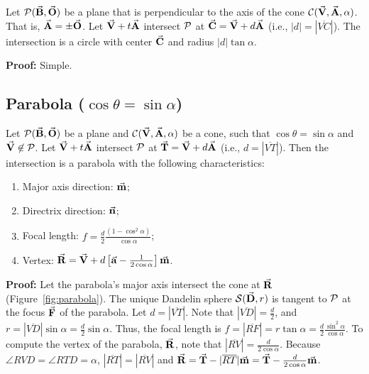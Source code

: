 \begin{lemma}
\label{lemma:parallel-1}
     Let ${\cal P}(\vec{\bf B},\vec{\bf O})$ be a plane that is perpendicular to
the axis of the cone ${\cal C}(\vec{\bf V},\vec{\bf A},\alpha)$.
That is, $\vec{\bf A} = \pm\vec{\bf O}$.  Let $\vec{\bf V}+t\vec{\bf A}$ intersect
${\cal P}$ at $\vec{\bf C}=\vec{\bf V}+d\vec{\bf A}$ (i.e., $|d| = |\overline{VC}|$).
The intersection is a circle with center $\vec{\bf C}$ and radius
$|d| \tan \alpha$.
\end{lemma}
{\bf Proof:} Simple. \QED

\clearpage


\subsection{Parabola ($\cos\theta=\sin\alpha$)}
\label{section:parabola}

\begin{theorem}
\label{theorem:parabola}
Let ${\cal P}(\vec{\bf B},\vec{\bf O})$ be a plane and
${\cal C}(\vec{\bf V},\vec{\bf A},\alpha)$ be a cone, such that
$\cos\theta=\sin\alpha$ and $\vec{\bf V}\not\in{\cal P}$.
Let $\vec{\bf V}+t\vec{\bf A}$ intersect
${\cal P}$ at $\vec{\bf T}=\vec{\bf V}+d\vec{\bf A}$ (i.e., $d = |\overline{VT}|$).
Then the intersection is a parabola with the following characteristics:
\begin{enumerate}
     \item Major axis direction: $\vec{\bf m}$;
     \item Directrix direction: $\vec{\bf n}$;
     \item Focal length: $f=\frac{d}{2}\frac{(1-\cos^2\alpha)}{\cos\alpha}$;
     \item Vertex: 
          $\vec{\bf R}=\vec{\bf V}+d\left[
          \vec{\bf a}-\frac{1}{2\cos\alpha}\right]\vec{\bf m}$.
\end{enumerate}
\end{theorem}     
{\bf Proof:}
Let the parabola's major axis intersect the cone at 
$\vec{\bf R}$ (Figure~\ref{fig:parabola}).  
The unique Dandelin sphere ${\cal S}(\vec{\bf D},r)$
is tangent to ${\cal P}$ at the focus $\vec{\bf F}$ of the parabola.
Let $d=|\overline{VT}|$.  Note that $|\overline{VD}|=\frac{d}{2}$,
and $r=|\overline{VD}|\sin\alpha=\frac{d}{2}\sin\alpha$.  
Thus, the focal length is 
$f=|\overline{RF}|=r\tan\alpha=\frac{d}{2}\frac{\sin^2\alpha}{\cos\alpha}$.
To compute the vertex of the parabola, $\vec{\bf R}$, 
note that $|\overline{RV}|=\frac{d}{2\cos\alpha}$.
Because $\angle RVD=\angle RTD=\alpha$, $|\overline{RT}|=|\overline{RV}|$ and 
$\vec{\bf R}=\vec{\bf T}-|\overline{RT}|\vec{\bf m}=
\vec{\bf T}-\frac{d}{2\cos\alpha}\vec{\bf m}$.
\QED

